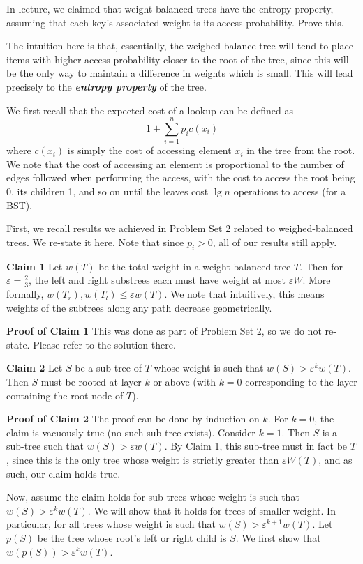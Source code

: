 \documentclass[12pt]{exam}
\newcommand*{\eps}{\varepsilon}  %
\begin{document}
\begin{questions}
In lecture, we claimed that weight-balanced trees have the entropy property, assuming that each key's associated weight is its access probability. Prove this.

\begin{solution}
The intuition here is that, essentially, the weighed balance tree will tend to place items with higher access probability closer to the root of the tree, since this will be the only way to maintain a difference in weights which is small. This will lead precisely to the \textit{\textbf{entropy property}} of the tree.


We first recall that the expected cost of a lookup can be defined as 
$$
  1 + \sum_{i=1}^n p_i c(x_i)
$$
where $c(x_i)$ is simply the cost of accessing element $x_i$ in the tree from the root. We note that the cost of accessing an element is proportional to the number of edges followed when performing the access, with the cost to access the root being 0, its children 1, and so on until the leaves cost $\lg n$ operations to access (for a BST).


First, we recall results we achieved in Problem Set 2 related to weighed-balanced trees. We re-state it here. Note that since $p_i > 0$, all of our results still apply.


\textbf{Claim 1}
Let $w(T)$ be the total weight in a weight-balanced tree $T$. Then for $\eps = \frac{2}{3}$, the left and right substrees each must have weight at most $\eps W$. More formally, $w(T_r), w(T_l) \leq \eps w(T)$. We note that intuitively, this means weights of the subtrees along any path decrease geometrically.


\textbf{Proof of Claim 1}
This was done as part of Problem Set 2, so we do not re-state. Please refer to the solution there.


\textbf{Claim 2}
Let $S$ be a sub-tree of $T$ whose weight is such that $w(S) > \eps^k w(T)$. Then $S$ must be rooted at layer $k$ or above (with $k = 0$ corresponding to the layer containing the root node of $T$).


\textbf{Proof of Claim 2}
The proof can be done by induction on $k$. For $k = 0$, the claim is vacuously true (no such sub-tree exists). Consider $k = 1$. Then $S$ is a sub-tree such that $w(S) > \eps w(T)$. By Claim 1, this sub-tree must in fact be $T$, since this is the only tree whose weight is strictly greater than $\eps W(T)$, and as such, our claim holds true.

Now, assume the claim holds for sub-trees whose weight is such that $w(S) > \eps^k w(T)$. We will show that it holds for trees of smaller weight. In particular, for all trees whose weight is such that $w(S) > \eps^{k+1} w(T)$. Let $p(S)$ be the tree whose root's left or right child is $S$. We first show that $w(p(S)) > \eps^k w(T)$.


\end{solution}
\end{questions}
\end{document}
